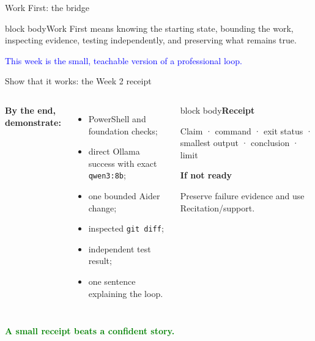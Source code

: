 \documentclass[aspectratio=169,11pt]{beamer}
\begin{document}
\begin{frame}{Work First: the bridge}\centering{}\vspace{.7cm}\begin{beamercolorbox}[sep=.7em,wd=.9\linewidth]{block body}\centering Work First means knowing the starting state, bounding the work, inspecting evidence, testing independently, and preserving what remains true.\end{beamercolorbox}\vfill\textcolor{blue}{This week is the small, teachable version of a professional loop.}\end{frame}
\begin{frame}{Show that it works: the Week 2 receipt}\begin{columns}[T]\textbf{By the end, demonstrate:}\begin{itemize}\item PowerShell and foundation checks;\item direct Ollama success with exact \texttt{qwen3:8b};\item one bounded Aider change;\item inspected \texttt{git diff};\item independent test result;\item one sentence explaining the loop.\end{itemize}\begin{beamercolorbox}[sep=.7em,wd=\linewidth]{block body}\textbf{Receipt}\par\scriptsize Claim · command · exit status · smallest output · conclusion · limit\par\vspace{.3cm}\textbf{If not ready}\par\scriptsize Preserve failure evidence and use Recitation/support.\end{beamercolorbox}\end{columns}\vfill\begin{center}\Large\textcolor{green}{\textbf{A small receipt beats a confident story.}}\end{center}\end{frame}
\end{document}
